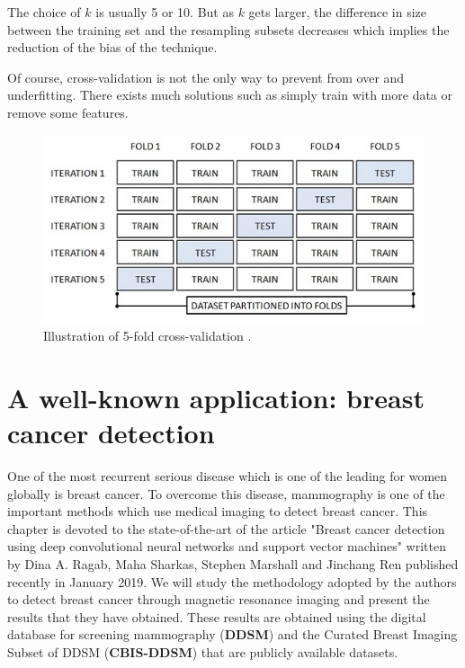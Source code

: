 \documentclass[11pt, openany]{report}
\theoremstyle{plain}
\theoremstyle{definition}
\theoremstyle{remark}
\begin{document}
The choice of $k$ is usually 5 or 10. But as $k$ gets larger, the difference in size between the training set and the resampling subsets decreases which implies the reduction of the bias of the technique.

Of course, cross-validation is not the only way to prevent from over and underfitting. There exists much solutions such as simply train with more data or remove some features. 


\begin{figure}[h]
  \centering
  \includegraphics[scale=1.3]{figures/cross-validation.jpg}
  \caption{Illustration of 5-fold cross-validation \cite{MachineLearningForDummies}.}
  \label{fig:over-under-fit}
\end{figure}


\chapter{A well-known application: breast cancer detection} \label{chap:breast-cancer}
One of the most recurrent serious disease which is one of the leading for women globally is breast cancer. To overcome this disease, mammography is one of the important methods which use medical imaging to detect breast cancer. This chapter is devoted to the state-of-the-art of the article "Breast cancer detection using deep convolutional neural networks and support vector machines" \cite{breast-cancer} written by Dina A. Ragab, Maha Sharkas, Stephen Marshall and Jinchang Ren published recently in January 2019. We will study the methodology adopted by the authors to detect breast cancer through magnetic resonance imaging and present the results that they have obtained. These results are obtained using the digital database for screening mammography (\textbf{DDSM}) and the Curated Breast Imaging Subset of DDSM (\textbf{CBIS-DDSM}) that are publicly available datasets.
\end{document}
